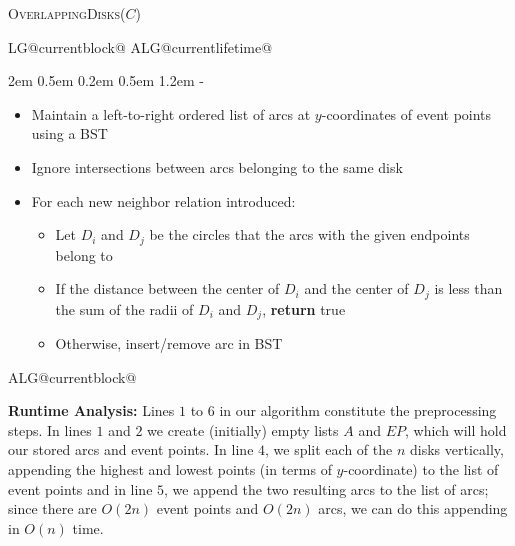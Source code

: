 \documentclass[11pt]{article}
\makeatletter
\newlength{\continueindent}
\renewenvironment{algorithmic}[1][0]%
   {%
   \edef\ALG@numberfreq{#1}%
   \def\@currentlabel{\theALG@line}%
   \setcounter{ALG@line}{0}%
   \setcounter{ALG@rem}{0}%
   \let\\\algbreak%
   \expandafter\edef\csname ALG@currentblock@\theALG@nested\endcsname{0}%
   \expandafter\let\csname ALG@currentlifetime@\theALG@nested\endcsname\relax%
   \begin{list}%
      {\ALG@step}%
      {%
      \rightmargin\z@%
      \itemsep\z@ \itemindent\z@ \listparindent2em%
      \partopsep\z@ \parskip\z@ \parsep\z@%
      \labelsep 0.5em \topsep 0.2em%
      \ifthenelse{\equal{#1}{0}}%
         {\labelwidth 0.5em}%
         {\labelwidth 1.2em}%
       \leftmargin\labelwidth \addtolength{\leftmargin}{\labelsep}
      \ALG@tlm\z@%
      }%
      \parshape 2 \leftmargin \linewidth \continueindent \dimexpr\linewidth-\continueindent\relax
   \setcounter{ALG@nested}{0}%
   \ALG@beginalgorithmic%
   }%
   {%
   \ALG@closeloops%
   \expandafter\ifnum\csname ALG@currentblock@\theALG@nested\endcsname=0\relax%
   \else%
      \PackageError{algorithmicx}{Some blocks are not closed!!!}{}%
   \fi%
   \ALG@endalgorithmic%
   \end{list}%
   }%
\makeatother
\begin{document}
\begin{enumerate}
    \begin{minipage}[t]{0.9\textwidth}
    \begin{algorithm}[H]
    \caption{\textsc{OverlappingDisks}($C$)}
    \begin{algorithmic}[1]
        \EndFor        
        \begin{itemize}
            \item Maintain a left-to-right ordered list of arcs at $y$-coordinates of event points using a BST
            \item Ignore intersections between arcs belonging to the same disk
            \item For each new neighbor relation introduced:
            \begin{itemize}
                \item Let $D_i$ and $D_j$ be the circles that the arcs with the given endpoints belong to
                \item If the distance between the center of $D_i$ and the center of $D_j$ is less than the sum of the radii of $D_i$ and $D_j$, \textbf{return} true
                \item Otherwise, insert/remove arc in BST
            \end{itemize}
        \end{itemize}
        \EndIf
        \EndIf 
    \end{algorithmic}
    \end{algorithm}
    \end{minipage}
    
    \vspace{1cm}

    \textbf{Runtime Analysis:} Lines $1$ to $6$ in our algorithm constitute the preprocessing steps. In lines $1$ and $2$ we create (initially) empty lists $A$ and $EP$, which will hold our stored arcs and event points. In line $4$, we split each of the $n$ disks vertically, appending the highest and lowest points (in terms of $y$-coordinate) to the list of event points and in line $5$, we append the two resulting arcs to the list of arcs; since there are $O(2n)$ event points and $O(2n)$ arcs, we can do this appending in $O(n)$ time. \\


\end{enumerate}
\end{document}
